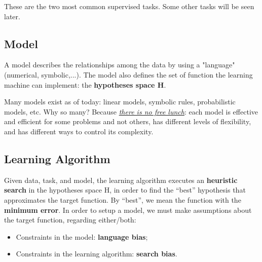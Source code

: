 These are the two most common supervised tasks. Some other tasks will be seen later.

\subsection{Model}

A model describes the relationships among the data by using a "language" (numerical, symbolic,...). The model also defines the set of function the learning machine can implement: the \textbf{hypotheses space H}. 

Many models exist as of today: linear models, symbolic rules, probabilistic models, etc. Why so many? Because \href{https://en.wikipedia.org/wiki/No_free_lunch_theorem}{\textit{there is no free lunch}}: each model is effective and efficient for some problems and not others, has different levels of flexibility, and has different ways to control its complexity.

\subsection{Learning Algorithm}

Given data, task, and model, the learning algorithm executes an \textbf{heuristic search} in the hypotheses space H, in order to find the ``best'' hypothesis that approximates the target function. By ``best'', we mean the function with the \textbf{minimum error}. In order to setup a model, we must make assumptions about the target function, regarding either/both:

\begin{itemize}
    \item Constraints in the model: \textbf{language bias};
    \item Constraints in the learning algorithm: \textbf{search bias}.
\end{itemize}

